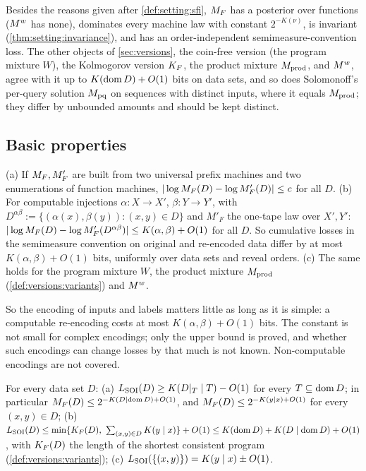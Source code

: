 \begin{remark}\label{rem:setting:recommend}
Besides the reasons given after \cref{def:setting:sfi}, $M_{F}$ has a posterior over functions ($M^{w}$ has none), dominates every machine law with constant $2^{-K(\nu)}$, is invariant (\cref{thm:setting:invariance}), and has an order-independent semimeasure-convention loss. The other objects of \cref{sec:versions}, the coin-free version (the program mixture $W$), the Kolmogorov version $K_{F}$, the product mixture $M_{\mathrm{prod}}$, and $M^{w}$, agree with it up to $K(\operatorname{dom} D)+O(1)$ bits on data sets, and so does Solomonoff's per-query solution $M_{\mathrm{pq}}$ on sequences with distinct inputs, where it equals $M_{\mathrm{prod}}$; they differ by unbounded amounts and should be kept distinct.
\end{remark}

\subsection{Basic properties}\label{sec:setting:basic}

\begin{theorem}[Invariance]\label{thm:setting:invariance}
(a) If $M_{F},M'_F$ are built from two universal prefix machines and two enumerations of function machines, $|\log M_{F}(D)-\log M'_F(D)|\le c$ for all $D$.
(b) For computable injections $\alpha:X\to X'$, $\beta:Y\to Y'$, with $D^{\alpha\beta}:=\{(\alpha(x),\beta(y)):(x,y)\in D\}$ and $M'_F$ the one-tape law over $X',Y'$: $|\log M_{F}(D)-\log M'_F(D^{\alpha\beta})|\le K(\alpha,\beta)+O(1)$ for all $D$. So cumulative losses in the semimeasure convention on original and re-encoded data differ by at most $K(\alpha,\beta)+O(1)$ bits, uniformly over data sets and reveal orders.
(c) The same holds for the program mixture $W$, the product mixture $M_{\mathrm{prod}}$ (\cref{def:versions:variants}) and $M^{w}$.
\end{theorem}

So the encoding of inputs and labels matters little as long as it is simple: a computable re-encoding costs at most $K(\alpha,\beta)+O(1)$ bits. The constant is not small for complex encodings; only the upper bound is proved, and whether such encodings can change losses by that much is not known. Non-computable encodings are not covered.

\begin{theorem}\label{thm:setting:coding}
For every data set $D$:
(a) $L_{\mathrm{SOI}}(D)\ge K(D|_T\mid T)-O(1)$ for every $T\subseteq\operatorname{dom} D$; in particular $M_{F}(D)\le2^{-K(D\mid\operatorname{dom} D)+O(1)}$, and $M_{F}(D)\le2^{-K(y\mid x)+O(1)}$ for every $(x,y)\in D$;
(b) $L_{\mathrm{SOI}}(D)\le\min\{K_{F}(D),\ \sum_{(x,y)\in D}K(y\mid x)\}+O(1)\le K(\operatorname{dom} D)+K(D\mid\operatorname{dom} D)+O(1)$, with $K_{F}(D)$ the length of the shortest consistent program (\cref{def:versions:variants});
(c) $L_{\mathrm{SOI}}(\{(x,y)\})=K(y\mid x)\pm O(1)$.
\end{theorem}

